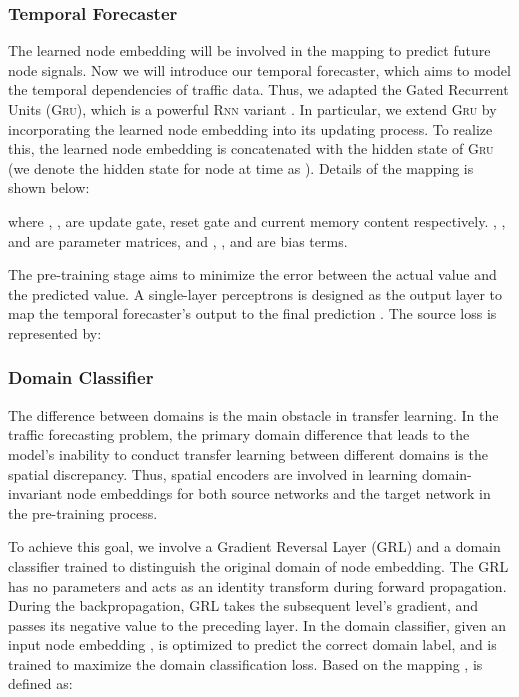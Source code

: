 \documentclass[sigconf]{acmart}
\theoremstyle{definition}
\begin{document}
\subsubsection{Temporal Forecaster}
The learned node embedding  will be involved in the mapping  to predict future node signals. Now we will introduce our temporal forecaster, which aims to model the temporal dependencies of traffic data. Thus, we adapted the Gated Recurrent Units (\textsc{Gru}), which is a powerful \textsc{Rnn} variant \cite{DBLP:journals/corr/ChungGCB14, fu2016using}. In particular, we extend \textsc{Gru} by incorporating the learned node embedding  into its updating process.
To realize this, the learned node embedding  is concatenated with the hidden state of \textsc{Gru} (we denote the hidden state for node  at time  as ). Details of the mapping  is shown below: 

where , ,  are update gate, reset gate and current memory content respectively. , , and  are parameter matrices, and , , and  are bias terms.

The pre-training stage aims to minimize the error between the actual value and the predicted value. 
A single-layer perceptrons is designed as the output layer to map the temporal forecaster's output  to the final prediction . The source loss is represented by:



\subsubsection{Domain Classifier}
The difference between domains is the main obstacle in transfer learning. In the traffic forecasting problem, the primary domain difference that leads to the model's inability to conduct transfer learning between different domains is the spatial discrepancy. Thus, spatial encoders are involved in learning domain-invariant node embeddings for both source networks and the target network in the pre-training process.


To achieve this goal, we involve a Gradient Reversal Layer (GRL) \cite{ganin2015unsupervised} and a domain classifier trained to distinguish the original domain of node embedding. The GRL has no parameters and acts as an identity transform during forward propagation. During the backpropagation, GRL takes the subsequent level's gradient, and passes its negative value to the preceding layer. 
In the domain classifier, given an input node embedding ,  is optimized to predict the correct domain label, and  is trained to maximize the domain classification loss. Based on the mapping ,  is defined as:
\end{document}
